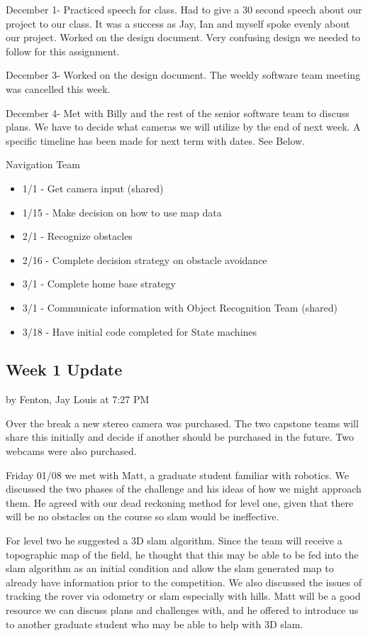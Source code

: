 \documentclass[10pt, oneside,onecolumn]{IEEEtran}
\begin{document}
\begin{titlepage}
December 1- Practiced speech for class. Had to give a 30 second speech about our project to our class. It was a success as Jay, Ian and myself spoke evenly about our project. 
Worked on the design document. Very confusing design we needed to follow for this assignment. 

December 3- Worked on the design document. The weekly software team meeting was cancelled this week. 

December 4- Met with Billy and the rest of the senior software team to discuss plans. We have to decide what cameras we will utilize by the end of next week. A specific timeline has been made for next term with dates. See Below.

Navigation Team
\begin{itemize}
\item 1/1 - Get camera input (shared)
\item 1/15 - Make decision on how to use map data
\item 2/1 - Recognize obstacles
\item 2/16 - Complete decision strategy on obstacle avoidance
\item 3/1 - Complete home base strategy
\item 3/1 - Communicate information with Object Recognition Team (shared)
\item 3/18 - Have initial code completed for State machines
\end{itemize}

\subsection{Week 1 Update}
by Fenton, Jay Louis at 7:27 PM

Over the break a new stereo camera was purchased. The two capstone teams will share this initially and decide if another should be purchased in the future. Two webcams were also purchased. 

Friday 01/08 we met with Matt, a graduate student familiar with robotics. We discussed the two phases of the challenge and his ideas of how we might approach them. He agreed with our dead reckoning method for level one, given that there will be no obstacles on the course so slam would be ineffective. 

For level two he suggested a 3D slam algorithm. Since the team will receive a topographic map of the field, he thought that this may be able to be fed into the slam algorithm as an initial condition and allow the slam generated map to already have information prior to the competition. We also discussed the issues of tracking the rover via odometry or slam especially with hills. Matt will be a good resource we can discuss plans and challenges with, and he offered to introduce us to another graduate student who may be able to help with 3D slam.


\end{titlepage}
\end{document}
